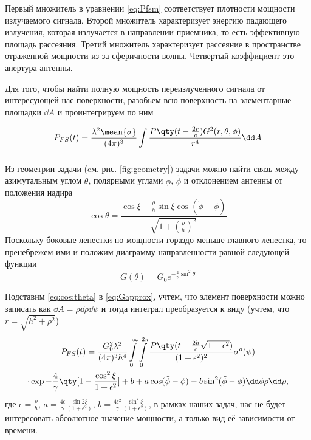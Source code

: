 Первый множитель в уравнении  \eqref{eq:Pfsm}  соответствует плотности мощности
излучаемого сигнала. Второй множитель характеризует энергию падающего
излучения, которая излучается в направлении приемника, то есть эффективную
площадь рассеяния. Третий множитель
характеризует рассеяние в пространстве отраженной мощности из-за
сферичности волны. Четвертый
коэффициент это апертура антенны.



Для того, чтобы найти полную мощность переизлученного сигнала от интересующей
нас поверхности,
разобьем всю поверхность на элементарные площадки $\dd A$ и проинтегрируем
по ним 

\begin{equation}
    P_{FS}(t) = \frac{\lambda^2\mean{\sigma}}{(4 \pi)^3 } \int\limits_{} 
    \frac
        {P\qty(t - \frac{2r}{c}) G^2(r,\theta,\phi) }
        {r^4} 
    \dd A
\end{equation}

 Из геометрии задачи (cм. рис. \ref{fig:geometry}) задачи можно найти связь между
 азимутальным углом $\theta$, полярными углами  $\phi$,  $\tilde \phi$ и
 отклонением антенны от положения надира
 \begin{equation}
     \label{eq:cos:theta}
     \cos \theta = 
     \frac{\cos \xi + \frac{\rho}{h} \sin \xi \cos(\tilde \phi - \phi)}{\sqrt{1
     + (\frac{\rho}{h})^2}}
 \end{equation}
 Поскольку боковые лепестки по мощности гораздо меньше главного лепестка, то
 пренебрежем ими и положим диаграмму направленности   равной следующей функции
 \begin{equation}
     \label{eq:Gapprox}
     G(\theta) = G_0 e^{-\frac{2}{\gamma} \sin^2 \theta}
 \end{equation}

 Подставим \eqref{eq:cos:theta} в \eqref{eq:Gapprox}, учтем, что  элемент
 поверхности можно записать как $\dd A = \rho \dd \rho \dd \psi$ и тогда
 интеграл преобразуется к виду  (учтем, что \newline$r = \sqrt{h^{2} + \rho^{2}}$)
 \begin{multline}
     P_{FS}(t) = \frac{G_0^2 \lambda^2}{(4 \pi)^3 h^4}
     \int\limits_{0}^{\infty} \int\limits_{0}^{2 \pi}   
     \frac{P\qty(t - \frac{2h}{c}\sqrt{1+ \epsilon^2})}{(1+\epsilon^2)^2} \sigma^o(\psi)
     \\
     \cdot \exp{-\frac{4}{\gamma} \qty[1 - \frac{\cos^2 \xi}{1+ \epsilon^2}] + b
     + a\cos(\tilde \phi - \phi) - b \sin^2(\tilde \phi - \phi)} \dd \phi \rho
     \dd \rho,
 \end{multline}
 где 
 $\epsilon = \frac{\rho}{h}$,
 $a = \frac{4\epsilon}{\gamma} \frac{\sin 2 \xi}{(1+ \epsilon^2)}$,
 $b= \frac{4\epsilon^2}{\gamma} \frac{\sin^2 \xi}{(1+\epsilon^2)}$,
 в рамках наших задач, нас не будет интересовать абсолютное значение мощности,
 а только  вид её зависимости от времени. 

